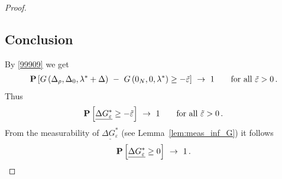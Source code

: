 \begin{proof}
\subsection*{Conclusion}
By \eqref{99909} we get
\begin{align*}
  \P
  \left[ 
   G
   \left( 
\Delta_\rho,\Delta_0,\lambda^*+\Delta
   \right)
   \ 
   -
   \ 
   G
   \left(
0_N,0,\lambda^*
   \right)
   \ge - 
  \tilde{\varepsilon}
  \right]
  \ 
  \to
  \ 
  1
  \qquad
  \text{for all}\ 
  \tilde{\varepsilon}>0
  \,.
\end{align*}
Thus
\begin{align*}
  \P
  \left[ 
  \underline{\Delta G^*_\varepsilon}
   \ge - 
  \tilde{\varepsilon}
  \right]
  \ 
  \to
  \ 
  1
  \qquad
  \text{for all}\ 
  \tilde{\varepsilon}>0
  \,.
\end{align*}
From the measurability of 
$
  \underline{\Delta G^*_\varepsilon}
$ 
(see Lemma~\ref{lem:meas_inf_G})
it follows
\begin{align*}
  \P
  \left[ 
  \underline{\Delta G^*_\varepsilon}
   \ge 0
  \right]
  \ 
  \to
  \ 
  1
  \,.
\end{align*}
 \end{proof}

